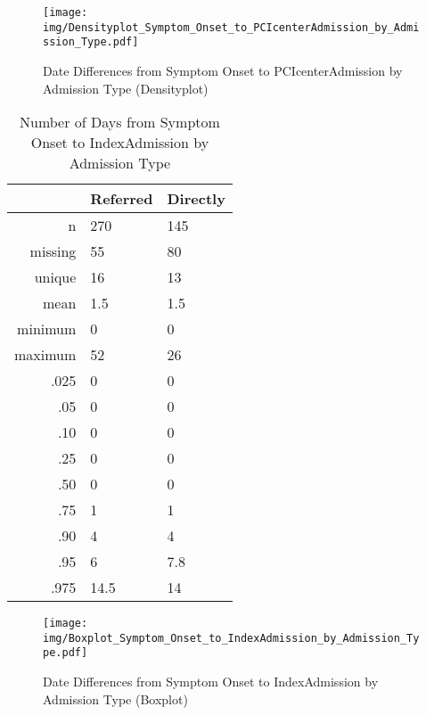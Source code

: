 \documentclass[presentation,xcolor=pdftex,dvipsnames,table,11pt]{beamer}
\begin{document}
\begin{tiny}
\begin{frame}
\begin{figure}
  \centering
  \caption{Date Differences from Symptom Onset to PCIcenterAdmission by Admission Type (Densityplot)}
  \label{Density: Date Differences from Symptom Onset to PCIcenterAdmission by Admission Type}
\texttt{[image: img/Densityplot\_Symptom\_Onset\_to\_PCIcenterAdmission\_by\_Admission\_Type.pdf]}\end{figure}
\end{frame}




\begin{table}[ht]
\centering
\begin{tabular}{rll}
  \toprule
 & Referred & Directly \\ 
  \midrule
n & 270 & 145 \\ 
  missing & 55 & 80 \\ 
  unique & 16 & 13 \\ 
  mean & 1.5 & 1.5 \\ 
  minimum & 0 & 0 \\ 
  maximum & 52 & 26 \\ 
  .025 & 0 & 0 \\ 
  .05 & 0 & 0 \\ 
  .10 & 0 & 0 \\ 
  .25 & 0 & 0 \\ 
  .50 & 0 & 0 \\ 
  .75 & 1 & 1 \\ 
  .90 & 4 & 4 \\ 
  .95 & 6 & 7.8 \\ 
  .975 & 14.5 & 14 \\ 
   \bottomrule
\end{tabular}
\caption{Number of Days from Symptom Onset to IndexAdmission by Admission Type} 
\end{table}
\begin{frame}
\begin{figure}
  \centering
  \caption{Date Differences from Symptom Onset to IndexAdmission by Admission Type (Boxplot)}
  \label{Boxplot: Date Differences from Symptom Onset to IndexAdmission by Admission Type}
\texttt{[image: img/Boxplot\_Symptom\_Onset\_to\_IndexAdmission\_by\_Admission\_Type.pdf]}\end{figure}
\end{frame}



\end{tiny}
\end{document}
